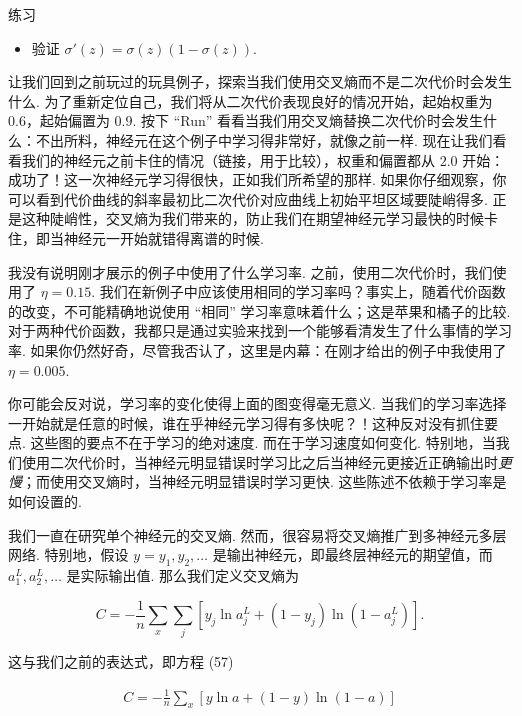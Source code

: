 \begin{exerciseBox}{练习}

\begin{itemize}

\item 验证 $\sigma'(z) = \sigma(z)(1-\sigma(z))$.

\end{itemize}

让我们回到之前玩过的玩具例子，探索当我们使用交叉熵而不是二次代价时会发生什么. 为了重新定位自己，我们将从二次代价表现良好的情况开始，起始权重为 $0.6$，起始偏置为 $0.9$. 按下 ``Run'' 看看当我们用交叉熵替换二次代价时会发生什么：不出所料，神经元在这个例子中学习得非常好，就像之前一样. 现在让我们看看我们的神经元之前卡住的情况（链接，用于比较），权重和偏置都从 $2.0$ 开始：成功了！这一次神经元学习得很快，正如我们所希望的那样. 如果你仔细观察，你可以看到代价曲线的斜率最初比二次代价对应曲线上初始平坦区域要陡峭得多. 正是这种陡峭性，交叉熵为我们带来的，防止我们在期望神经元学习最快的时候卡住，即当神经元一开始就错得离谱的时候.

我没有说明刚才展示的例子中使用了什么学习率. 之前，使用二次代价时，我们使用了 $\eta = 0.15$. 我们在新例子中应该使用相同的学习率吗？事实上，随着代价函数的改变，不可能精确地说使用 ``相同'' 学习率意味着什么；这是苹果和橘子的比较. 对于两种代价函数，我都只是通过实验来找到一个能够看清发生了什么事情的学习率. 如果你仍然好奇，尽管我否认了，这里是内幕：在刚才给出的例子中我使用了 $\eta = 0.005$.

你可能会反对说，学习率的变化使得上面的图变得毫无意义. 当我们的学习率选择一开始就是任意的时候，谁在乎神经元学习得有多快呢？！这种反对没有抓住要点. 这些图的要点不在于学习的绝对速度. 而在于学习速度如何变化. 特别地，当我们使用二次代价时，当神经元明显错误时学习比之后当神经元更接近正确输出时\emph{更慢}；而使用交叉熵时，当神经元明显错误时学习更快. 这些陈述不依赖于学习率是如何设置的.

我们一直在研究单个神经元的交叉熵. 然而，很容易将交叉熵推广到多神经元多层网络. 特别地，假设 $y = y_1, y_2, \ldots$ 是输出神经元，即最终层神经元的期望值，而 $a^L_1, a^L_2, \ldots$ 是实际输出值. 那么我们定义交叉熵为

\begin{equation}
C = -\frac{1}{n} \sum_x \sum_j \left[y_j \ln a^L_j + (1-y_j) \ln (1-a^L_j) \right].
\tag{63}
\end{equation}

\noindent 这与我们之前的表达式，即方程 (57)

\begin{align*}
C = -\frac{1}{n} \sum_x \left[y \ln a + (1-y ) \ln (1-a) \right] \nonumber
\end{align*}


\end{exerciseBox}
